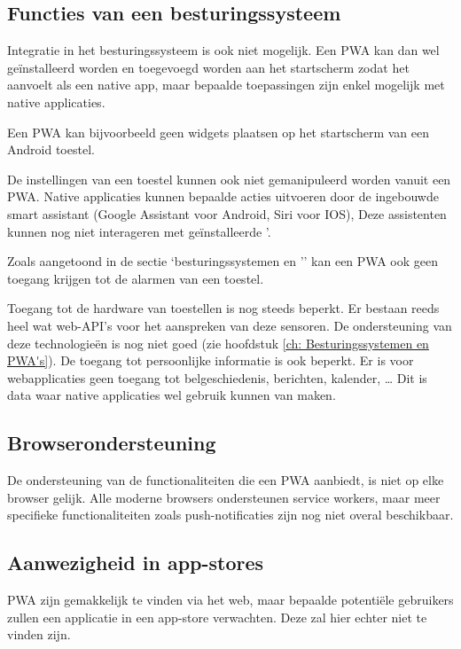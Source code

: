 	
\subsection{Functies van een besturingssysteem}

	Integratie in het besturingssysteem is ook niet mogelijk. Een PWA kan dan wel geïnstalleerd worden en toegevoegd worden aan het startscherm zodat het aanvoelt als een native app, maar bepaalde toepassingen zijn enkel mogelijk met native applicaties.
	
	Een PWA kan bijvoorbeeld geen widgets plaatsen op het startscherm van een Android toestel. 
	
	De instellingen van een toestel kunnen ook niet gemanipuleerd worden vanuit een PWA. Native applicaties kunnen bepaalde acties uitvoeren door de ingebouwde smart assistant (Google Assistant voor Android, Siri voor IOS), Deze assistenten kunnen nog niet interageren met geïnstalleerde '.
	
	Zoals aangetoond in de sectie ‘besturingssystemen en '’ kan een PWA ook geen toegang krijgen tot de alarmen van een toestel.
	
	Toegang tot de hardware van toestellen is nog steeds beperkt. Er bestaan reeds heel wat web-API’s voor het aanspreken van deze sensoren. De ondersteuning van deze technologieën is nog niet goed (zie hoofdstuk \ref{ch: Besturingssystemen en PWA's}).
	De toegang tot persoonlijke informatie is ook beperkt. Er is voor webapplicaties geen toegang tot belgeschiedenis, berichten, kalender, … Dit is data waar native applicaties wel gebruik kunnen van maken.
	
	\autocite{Brousek2017}
	
\subsection{Browserondersteuning}

	De ondersteuning van de functionaliteiten die een PWA aanbiedt, is niet op elke browser gelijk. Alle moderne browsers ondersteunen service workers, maar meer specifieke functionaliteiten zoals push-notificaties zijn nog niet overal beschikbaar.
	
	
\subsection{Aanwezigheid in app-stores}
	PWA zijn gemakkelijk te vinden via het web, maar bepaalde potentiële gebruikers zullen een applicatie in een app-store verwachten. Deze zal hier echter niet te vinden zijn.
	
